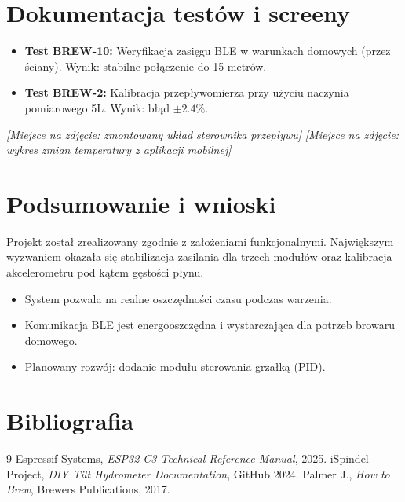\documentclass[12pt,a4paper]{article}
\begin{document}
\section{Dokumentacja testów i screeny}
\begin{itemize}
    \item \textbf{Test BREW-10:} Weryfikacja zasięgu BLE w warunkach domowych (przez ściany). Wynik: stabilne połączenie do 15 metrów.
    \item \textbf{Test BREW-2:} Kalibracja przepływomierza przy użyciu naczynia pomiarowego 5L. Wynik: błąd $\pm 2.4\%$.
\end{itemize}
\textit{[Miejsce na zdjęcie: zmontowany układ sterownika przepływu]}
\textit{[Miejsce na zdjęcie: wykres zmian temperatury z aplikacji mobilnej]}

\section{Podsumowanie i wnioski}
Projekt został zrealizowany zgodnie z założeniami funkcjonalnymi. Największym wyzwaniem okazała się stabilizacja zasilania dla trzech modułów oraz kalibracja akcelerometru pod kątem gęstości płynu. 
\begin{itemize}
    \item System pozwala na realne oszczędności czasu podczas warzenia.
    \item Komunikacja BLE jest energooszczędna i wystarczająca dla potrzeb browaru domowego.
    \item Planowany rozwój: dodanie modułu sterowania grzałką (PID).
\end{itemize}

\section{Bibliografia}
\begin{thebibliography}{9}
 Espressif Systems, \textit{ESP32-C3 Technical Reference Manual}, 2025.
 iSpindel Project, \textit{DIY Tilt Hydrometer Documentation}, GitHub 2024.
 Palmer J., \textit{How to Brew}, Brewers Publications, 2017.
\end{thebibliography}
\end{document}

